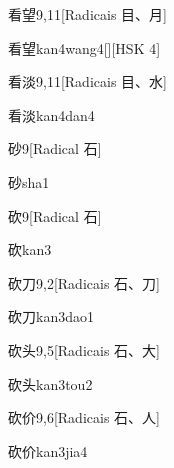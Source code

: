 \begin{entry}{看望}{9,11}[Radicais ⽬、⽉]
  \begin{phonetics}{看望}{kan4wang4}[][HSK 4]
  \end{phonetics}
\end{entry}

\begin{entry}{看淡}{9,11}[Radicais ⽬、⽔]
  \begin{phonetics}{看淡}{kan4dan4}
  \end{phonetics}
\end{entry}

\begin{entry}{砂}{9}[Radical ⽯]
  \begin{phonetics}{砂}{sha1}
  \end{phonetics}
\end{entry}

\begin{entry}{砍}{9}[Radical ⽯]
  \begin{phonetics}{砍}{kan3}
  \end{phonetics}
\end{entry}

\begin{entry}{砍刀}{9,2}[Radicais ⽯、⼑]
  \begin{phonetics}{砍刀}{kan3dao1}
  \end{phonetics}
\end{entry}

\begin{entry}{砍头}{9,5}[Radicais ⽯、⼤]
  \begin{phonetics}{砍头}{kan3tou2}
  \end{phonetics}
\end{entry}

\begin{entry}{砍价}{9,6}[Radicais ⽯、⼈]
  \begin{phonetics}{砍价}{kan3jia4}
  \end{phonetics}
\end{entry}

